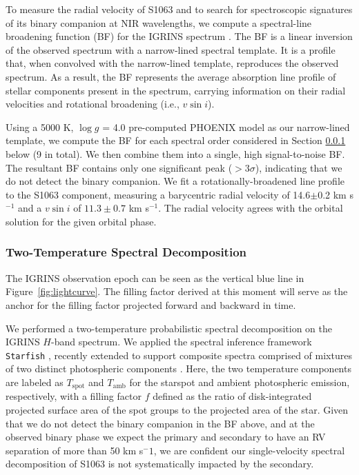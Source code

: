 \documentclass[twocolumn,tighten]{aastex631}
\begin{document}
To measure the radial velocity of S1063 and to search for spectroscopic signatures of its binary companion at NIR wavelengths, we compute a spectral-line broadening function (BF) for the IGRINS spectrum \citep[e.g.,][]{Tofflemireetal2019}. The BF is a linear inversion of the observed spectrum with a narrow-lined spectral template. It is a profile that, when convolved with the narrow-lined template, reproduces the observed spectrum. As a result, the BF represents the average absorption line profile of stellar components present in the spectrum, carrying information on their radial velocities and rotational broadening (i.e., $v \sin i$).

Using a 5000 K, $\log g$ = 4.0 pre-computed PHOENIX model \citep{husser13} as our narrow-lined template, we compute the BF for each spectral order considered in Section \ref{sec:starfish} below (9 in total). We then combine them into a single, high signal-to-noise BF. The resultant BF contains only one significant peak ($>3 \sigma$), indicating that we do not detect the binary companion. We fit a rotationally-broadened line profile \citep[][]{gray_book} to the S1063 component, measuring a barycentric radial velocity of 14.6$\pm$0.2 km s$^{-1}$ and a $v \sin i$ of $11.3\pm0.7$ km s$^{-1}$. The radial velocity agrees with the \citet{geller2021} orbital solution for the given orbital phase. 

\subsubsection{Two-Temperature Spectral Decomposition}
\label{sec:starfish}

The IGRINS observation epoch can be seen as the vertical blue line in Figure~\ref{fig:lightcurve}. The filling factor derived at this moment will serve as the anchor for the filling factor projected forward and backward in time.

We performed a two-temperature probabilistic spectral decomposition on the IGRINS $H$-band spectrum.  We applied the spectral inference framework \texttt{Starfish} \citep{czekala15}, recently extended to support composite spectra comprised of mixtures of two distinct photospheric components \citep{gullysantiago17}.  Here, the two temperature components are labeled as $T_{\mathrm{spot}}$ and $T_{\mathrm{amb}}$ for the starspot and ambient photospheric emission, respectively, with a filling factor $f$ defined as the ratio of disk-integrated projected surface area of the spot groups to the projected area of the star. Given that we do not detect the binary companion in the BF above, and at the observed binary phase we expect the primary and secondary to have an RV separation of more than  50 km s$^-1$, we are confident our single-velocity spectral decomposition of S1063 is not systematically impacted by the secondary.
\end{document}
